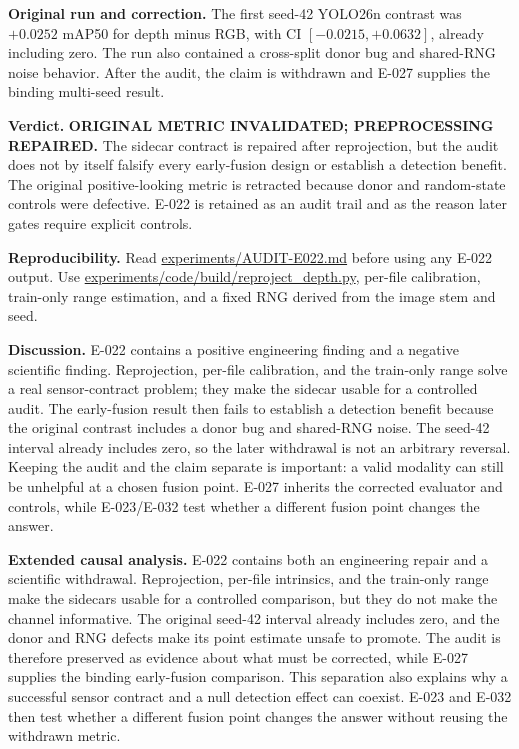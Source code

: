 \documentclass[preprint,12pt]{elsarticle}
\newcommand{\pathcode}[1]{\scriptsize\url{#1}}
\begin{document}
\textbf{Original run and correction.} The first seed-42 YOLO26n contrast was
\(+0.0252\) mAP50 for depth minus RGB, with CI
\([-0.0215,+0.0632]\), already including zero. The run also contained a
cross-split donor bug and shared-RNG noise behavior. After the audit, the
claim is withdrawn and E-027 supplies the binding multi-seed result.

\textbf{Verdict.} \textbf{ORIGINAL METRIC INVALIDATED; PREPROCESSING
REPAIRED.} The sidecar contract is repaired after reprojection, but the audit
does not by itself falsify every early-fusion design or establish a detection
benefit. The original positive-looking metric is retracted because donor and
random-state controls were defective. E-022 is retained as an audit trail and
as the reason later gates require explicit controls.

\textbf{Reproducibility.} Read \pathcode{experiments/AUDIT-E022.md}
before using any E-022 output. Use \pathcode{experiments/code/build/reproject_depth.py},
per-file calibration, train-only range estimation, and a fixed RNG derived
from the image stem and seed.

\textbf{Discussion.} E-022 contains a positive engineering finding and a
negative scientific finding. Reprojection, per-file calibration, and the
train-only range solve a real sensor-contract problem; they make the sidecar
usable for a controlled audit. The early-fusion result then fails to establish
a detection benefit because the original contrast includes a donor bug and
shared-RNG noise. The seed-42 interval already includes zero, so the later
withdrawal is not an arbitrary reversal. Keeping the audit and the claim
separate is important: a valid modality can still be unhelpful at a chosen
fusion point. E-027 inherits the corrected evaluator and controls, while
E-023/E-032 test whether a different fusion point changes the answer.

\textbf{Extended causal analysis.} E-022 contains both an engineering repair
and a scientific withdrawal. Reprojection, per-file intrinsics, and the
train-only range make the sidecars usable for a controlled comparison, but
they do not make the channel informative. The original seed-42 interval
already includes zero, and the donor and RNG defects make its point estimate
unsafe to promote. The audit is therefore preserved as evidence about what
must be corrected, while E-027 supplies the binding early-fusion comparison.
This separation also explains why a successful sensor contract and a null
detection effect can coexist. E-023 and E-032 then test whether a different
fusion point changes the answer without reusing the withdrawn metric.
\end{document}

